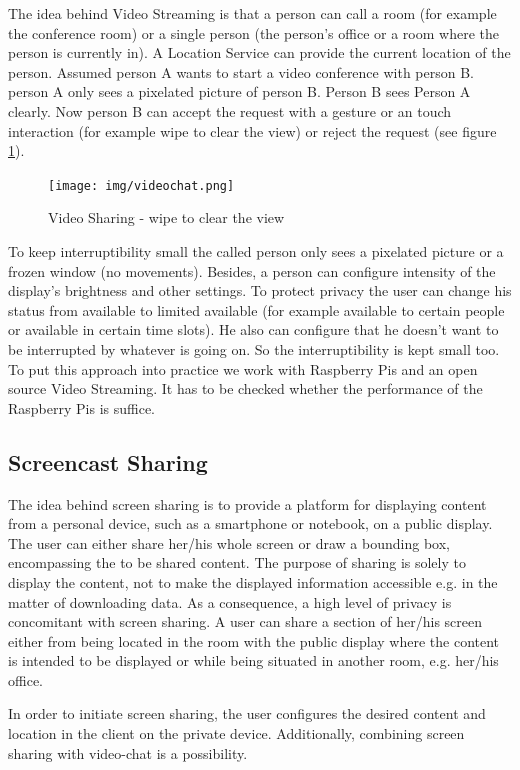 The idea behind Video Streaming is that a person can call a room 
(for example the conference room) or a single person (the person’s office or a room where the person is currently in).
A Location Service can provide the current location of the person.
Assumed person A wants to start a video conference with person B. person A only sees a pixelated picture of person B. Person B sees Person A clearly. Now person B can accept the request with a gesture or an touch interaction (for example wipe to clear the view) or reject the request (see figure \ref{video_sharing_pic}).
\begin{figure}
	\centering
	\texttt{[image: img/videochat.png]}
	\caption[Video Sharing]{Video Sharing - wipe to clear the view}
	\label{video_sharing_pic}
\end{figure}
To keep interruptibility small the called person only sees a pixelated picture or a frozen window (no movements). Besides, a person can configure intensity of the display’s brightness and other settings. 
To protect privacy the user can change his status from available to limited available (for example available to certain people or available in certain time slots). He also can configure that he doesn't want to be interrupted by whatever is going on. So the interruptibility is kept small too. To put this approach into practice we work with Raspberry Pis and an open source Video Streaming. It has to be checked whether the performance of the Raspberry Pis is suffice.

\subsection{Screencast Sharing}

The idea behind screen sharing is to provide a platform for displaying content from a personal device, such as a smartphone or notebook, on a public display.
The user can either share her/his whole screen or draw a bounding box, encompassing the to be shared content.
The purpose of sharing is solely to display the content, not to make the displayed information accessible e.g. in the matter of downloading data.
As a consequence, a high level of privacy is concomitant with screen sharing.
A user can share a section of her/his screen either from being located in the room with the public display where the content is intended to be displayed or while being situated in another room, e.g. her/his office.

In order to initiate screen sharing, the user configures the desired content and location in the client on the private device.
Additionally, combining screen sharing with video-chat is a possibility.

